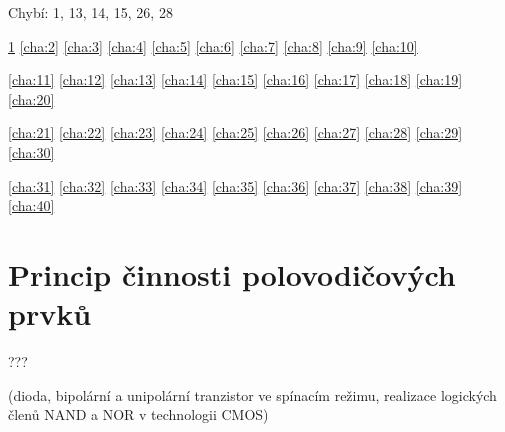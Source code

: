 \documentclass[a4paper, 11pt]{report}
\begin{document}
Chybí: 1, 13, 14, 15, 26, 28

\ref{cha:1}
\ref{cha:2}
\ref{cha:3}
\ref{cha:4}
\ref{cha:5}
\ref{cha:6}
\ref{cha:7}
\ref{cha:8}
\ref{cha:9}
\ref{cha:10}

\ref{cha:11}
\ref{cha:12}
\ref{cha:13}
\ref{cha:14}
\ref{cha:15}
\ref{cha:16}
\ref{cha:17}
\ref{cha:18}
\ref{cha:19}
\ref{cha:20}

\ref{cha:21}
\ref{cha:22}
\ref{cha:23}
\ref{cha:24}
\ref{cha:25}
\ref{cha:26}
\ref{cha:27}
\ref{cha:28}
\ref{cha:29}
\ref{cha:30}

\ref{cha:31}
\ref{cha:32}
\ref{cha:33}
\ref{cha:34}
\ref{cha:35}
\ref{cha:36}
\ref{cha:37}
\ref{cha:38}
\ref{cha:39}
\ref{cha:40}

\newpage

\tableofcontents


\chapter{Princip činnosti polovodičových prvků} \label{cha:1}

???

(dioda, bipolární a unipolární tranzistor ve spínacím režimu, realizace logických členů NAND a NOR v technologii CMOS)
\end{document}
